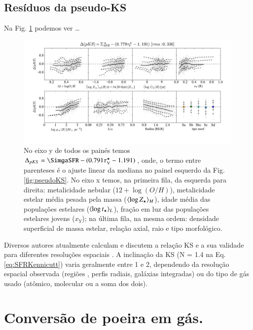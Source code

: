 \subsection{Resíduos da pseudo-KS}
\label{sec:gasfrac:KS:resid}
 
Na Fig. \ref{fig:pseudoKSresid} podemos ver \ldots 
\begin{figure}
	\centering
	\includegraphics[width=0.99\textwidth]{figuras/deltapKS.pdf}
	\caption[Resíduos da {\em pseudo-KS}.]
	{No eixo y de todos os painés temos $\Delta_{pKS} = \SimgaSFR - (0.791 \tauVS - 1.191)$, onde, o
termo entre parenteses é o ajuste linear da mediana no painel esquerdo da Fig. \ref{fig:pseudoKS}.
No eixo x temos, na primeira fila, da esquerda para direita: metalicidade nebular ($12 + \log
(O/H)$), metalicidade estelar média pesada pela massa ($\meanM{\log Z_\star}$), idade média das
populações estelares ($\meanL{\log t_\star}$), fração em luz das populações estelares jovens
($x_Y$); na última fila, na mesma ordem: densidade superficial de massa estelar, relação axial, raio
e tipo morfológico.}
	\label{fig:pseudoKSresid}
\end{figure}

Diversos autores atualmente calculam e discutem a relação KS e a sua validade para diferentes
resoluções espaciais \citep[e.g., ][]{Kennicutt.etal.2007a, Leroy.etal.2012a,
Calzetti.Liu.Koda.2012a, Lada.etal.2013a, Tacconi.etal.2013a, Casasola.etal.2015a}. A inclinação
da KS (N = 1.4 na Eq. \ref{eq:SFRKennicutt}) varia geralmente entre 1 e 2, dependendo da resolução
espacial observada (regiões \Hii, perfis radiais, galáxias integradas) ou do tipo de gás usado
(atômico, molecular ou a soma dos dois).

\section{Conversão de poeira em gás.}
\label{sec:gasfrac:gas2dust}


